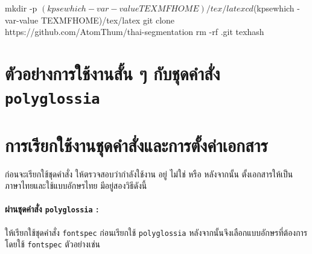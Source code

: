 \begin{bashsource}{}
mkdir -p $(kpsewhich -var-value TEXMFHOME)/tex/latex
cd $(kpsewhich -var-value TEXMFHOME)/tex/latex
git clone https://github.com/AtomThum/thai-segmentation
rm -rf .git
texhash
\end{bashsource}

\section{ตัวอย่างการใช้งานสั้น ๆ กับชุดคำสั่ง \texttt{polyglossia}}


\section{การเรียกใช้งานชุดคำสั่งและการตั้งค่าเอกสาร}
\label{sec:configuration}

ก่อนจะเรียกใช้ชุดคำสั่ง ให้ตรวจสอบว่ากำลังใช้งาน \lualatexlogo อยู่ ไม่ใช่
\pdftexlogo หรือ \xelatexlogo หลังจากนั้น
ตั้งเอกสารให้เป็นภาษาไทยและใช้แบบอักษรไทย มีอยู่สองวิธี\hbox{ดังนี้}

\paragraph{ผ่านชุดคำสั่ง \texttt{polyglossia} :}

ให้เรียกใช้ชุดคำสั่ง \texttt{fontspec} ก่อนเรียกใช้ \texttt{polyglossia}
หลังจากนั้นจึงเลือกแบบอักษรที่ต้องการโดยใช้ \texttt{fontspec} ตัวอย่างเช่น


